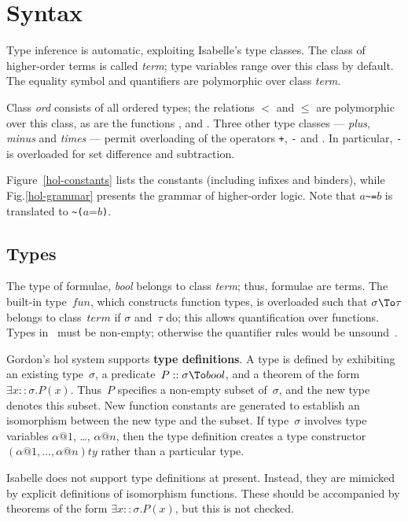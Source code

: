 \section{Syntax}
Type inference is automatic, exploiting Isabelle's type classes.  The class
of higher-order terms is called {\it term\/}; type variables range over
this class by default.  The equality symbol and quantifiers are polymorphic
over class {\it term}.  

Class {\it ord\/} consists of all ordered types; the relations $<$ and
$\leq$ are polymorphic over this class, as are the functions
,  and .  Three other
type classes --- {\it plus}, {\it minus\/} and {\it times} --- permit
overloading of the operators {\tt+}, {\tt-} and {\tt*}.  In particular,
{\tt-} is overloaded for set difference and subtraction.

Figure~\ref{hol-constants} lists the constants (including infixes and
binders), while Fig.\ts \ref{hol-grammar} presents the grammar of
higher-order logic.  Note that $a$\verb|~=|$b$ is translated to
\verb|~(|$a$=$b$\verb|)|.

\subsection{Types}\label{HOL-types}
The type of formulae, {\it bool} belongs to class {\it term}; thus,
formulae are terms.  The built-in type~$fun$, which constructs function
types, is overloaded such that $\sigma\To\tau$ belongs to class~$term$ if
$\sigma$ and~$\tau$ do; this allows quantification over functions.  Types
in \HOL\ must be non-empty; otherwise the quantifier rules would be
unsound~\cite[\S7]{paulson-COLOG}.

Gordon's {\sc hol} system supports {\bf type definitions}.  A type is
defined by exhibiting an existing type~$\sigma$, a predicate~$P::\sigma\To
bool$, and a theorem of the form $\exists x::\sigma.P(x)$.  Thus~$P$
specifies a non-empty subset of~$\sigma$, and the new type denotes this
subset.  New function constants are generated to establish an isomorphism
between the new type and the subset.  If type~$\sigma$ involves type
variables $\alpha@1$, \ldots, $\alpha@n$, then the type definition creates
a type constructor $(\alpha@1,\ldots,\alpha@n)ty$ rather than a particular
type.

Isabelle does not support type definitions at present.  Instead, they are
mimicked by explicit definitions of isomorphism functions.  These should be
accompanied by theorems of the form $\exists x::\sigma.P(x)$, but this is
not checked.


